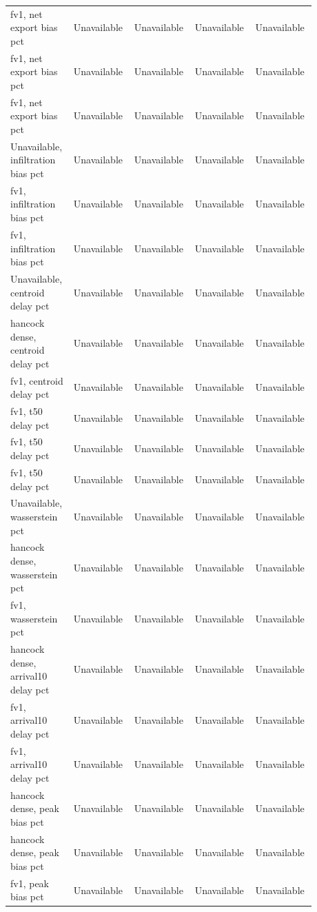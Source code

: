 \begin{longtable}{p{0.1760\linewidth}p{0.1760\linewidth}p{0.1760\linewidth}p{0.1760\linewidth}p{0.1760\linewidth}}
fv1, net export bias pct & Unavailable & Unavailable & Unavailable & Unavailable \\
fv1, net export bias pct & Unavailable & Unavailable & Unavailable & Unavailable \\
fv1, net export bias pct & Unavailable & Unavailable & Unavailable & Unavailable \\
Unavailable, infiltration bias pct & Unavailable & Unavailable & Unavailable & Unavailable \\
fv1, infiltration bias pct & Unavailable & Unavailable & Unavailable & Unavailable \\
fv1, infiltration bias pct & Unavailable & Unavailable & Unavailable & Unavailable \\
Unavailable, centroid delay pct & Unavailable & Unavailable & Unavailable & Unavailable \\
hancock dense, centroid delay pct & Unavailable & Unavailable & Unavailable & Unavailable \\
fv1, centroid delay pct & Unavailable & Unavailable & Unavailable & Unavailable \\
fv1, t50 delay pct & Unavailable & Unavailable & Unavailable & Unavailable \\
fv1, t50 delay pct & Unavailable & Unavailable & Unavailable & Unavailable \\
fv1, t50 delay pct & Unavailable & Unavailable & Unavailable & Unavailable \\
Unavailable, wasserstein pct & Unavailable & Unavailable & Unavailable & Unavailable \\
hancock dense, wasserstein pct & Unavailable & Unavailable & Unavailable & Unavailable \\
fv1, wasserstein pct & Unavailable & Unavailable & Unavailable & Unavailable \\
hancock dense, arrival10 delay pct & Unavailable & Unavailable & Unavailable & Unavailable \\
fv1, arrival10 delay pct & Unavailable & Unavailable & Unavailable & Unavailable \\
fv1, arrival10 delay pct & Unavailable & Unavailable & Unavailable & Unavailable \\
hancock dense, peak bias pct & Unavailable & Unavailable & Unavailable & Unavailable \\
hancock dense, peak bias pct & Unavailable & Unavailable & Unavailable & Unavailable \\
fv1, peak bias pct & Unavailable & Unavailable & Unavailable & Unavailable \\

\end{longtable}
